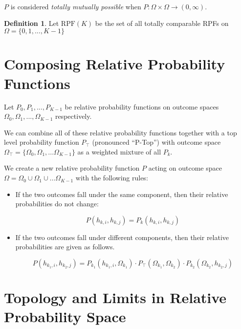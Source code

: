 \documentclass[twoside]{article}
\newcommand{\quotes}[1]{``#1''}
\theoremstyle{plain}%
\theoremstyle{definition}
\newtheorem{definition}{Definition}[section]
\theoremstyle{remark}
\begin{document}
\(P\) is considered \textit{totally mutually possible} when \(P: \Omega \times \Omega \rightarrow (0, \infty)\).

\begin{definition}
Let \(\text{RPF}(K)\) be the set of all totally comparable RPFs on \(\Omega = \{0, 1, ..., K-1\}\)
\end{definition}

\section{Composing Relative Probability Functions}

Let \(P_0, P_1, ..., P_{K-1}\) be relative probability functions on outcome spaces \(\Omega_0, \Omega_1, ..., \Omega_{K-1}\) respectively.

We can combine all of these relative probability functions together with a top level probability function \(P_\top\) (pronounced \quotes{P-Top}) with outcome space \(\Omega_\top = \{\Omega_0, \Omega_1, ... \Omega_{K- 1}\}\) as a weighted mixture of all \(P_k\).

We create a new relative probability function \(P\) acting on outcome space \(\Omega = \Omega_0 \cup \Omega_1 \cup \dots \Omega_{K-1}\) with the following rules:

\begin{itemize}
\item If the two outcomes fall under the same component, then their relative probabilities do not change:

\begin{equation}
\label{rpf_composition_same_branch}
P(h_{k, i}, h_{k, j}) = P_k(h_{k, i}, h_{k, j})
\end{equation}

\item If the two outcomes fall under different components, then their relative probabilities are given as follows.

\begin{equation}
\label{eq:rpf_composition_different_branch}
P(h_{k_1, i}, h_{k_2, j}) = P_{k_1}(h_{k_1, i}, \Omega_{k_1}) \cdot  P_{\top}(\Omega_{k_1}, \Omega_{k_2}) \cdot P_{k_2}(\Omega_{k_2}, h_{k_2, j})
\end{equation}
\end{itemize}

\section{Topology and Limits in Relative Probability Space}
\label{section:topology}
\end{document}
